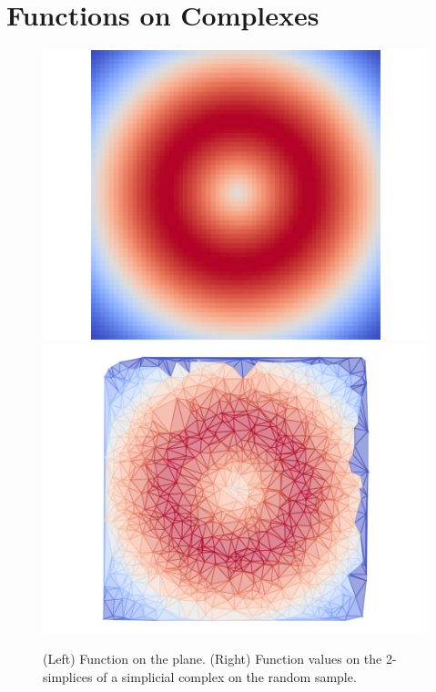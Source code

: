 \begin{figure}[htbp]
\centering
    \caption{}
    \label{fig:balloons2}
\end{figure}

\section{Functions on Complexes}

\begin{figure}[htbp]
\centering
    \includegraphics[scale=0.5]{figures/fgrid.pdf}\hspace{-0.5in}
    \includegraphics[scale=0.5]{figures/fcomplex.pdf}
    \caption{(Left) Function on the plane.
            (Right) Function values on the 2-simplices of a simplicial complex on the random sample.}
    \label{fig:function}
\end{figure}

